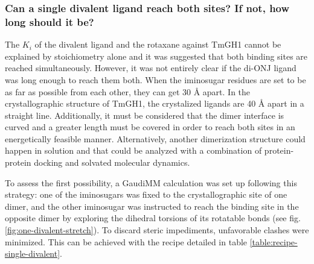 \subsubsection{Can a single divalent ligand reach both sites? If not, how long should it be?}
\label{section:di-ONJ-stretch}

The $K_{i}$ of the divalent ligand and the rotaxane against TmGH1 cannot be explained by stoichiometry alone and it was suggested that both binding sites are reached simultaneously. However, it was not entirely clear if the di-ONJ ligand was long enough to reach them both. When the iminosugar residues are set to be as far as possible from each other, they can get 30 Å apart. In the crystallographic structure of TmGH1,\cite{pdb:2wbg} the crystalized ligands are 40 Å apart in a straight line. Additionally, it must be considered that the dimer interface is curved and a greater length must be covered in order to reach both sites in an energetically feasible manner. Alternatively, another dimerization structure could happen in solution and that could be analyzed with a combination of protein-protein docking and solvated molecular dynamics.

To assess the first possibility, a GaudiMM calculation was set up following this strategy: one of the iminosugars was fixed to the crystallographic site of one dimer, and the other iminosugar was instructed to reach the binding site in the opposite dimer by exploring the dihedral torsions of its rotatable bonds (see fig. \ref{fig:one-divalent-stretch}). To discard steric impediments, unfavorable clashes were minimized. This can be achieved with the recipe detailed in table \ref{table:recipe-single-divalent}.


